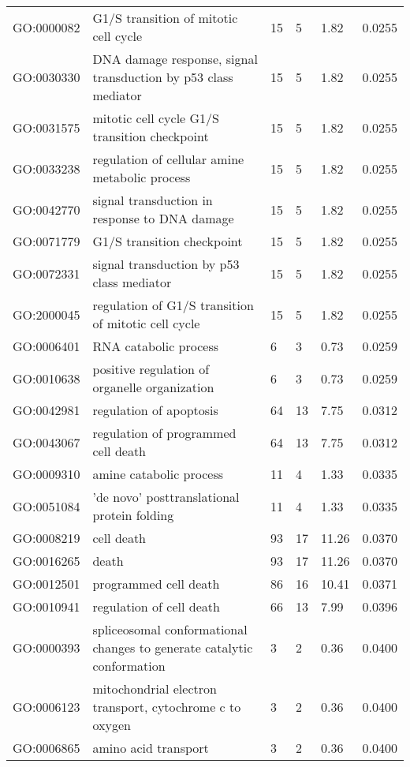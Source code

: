 \documentclass[10pt]{bmc_article}
\newenvironment{bmcformat}{\begin{raggedright}\baselineskip20pt\sloppy\setboolean{publ}{false}}{\end{raggedright}\baselineskip20pt\sloppy}
\begin{document}
\begin{bmcformat}
\begin{longtable}{lp{3cm}llll}
  GO:0000082 & G1/S transition of mitotic cell cycle &  15 &   5 & 1.82 & 0.0255 \\ 
  GO:0030330 & DNA damage response, signal transduction by p53 class mediator &  15 &   5 & 1.82 & 0.0255 \\ 
  GO:0031575 & mitotic cell cycle G1/S transition checkpoint &  15 &   5 & 1.82 & 0.0255 \\ 
  GO:0033238 & regulation of cellular amine metabolic process &  15 &   5 & 1.82 & 0.0255 \\ 
  GO:0042770 & signal transduction in response to DNA damage &  15 &   5 & 1.82 & 0.0255 \\ 
  GO:0071779 & G1/S transition checkpoint &  15 &   5 & 1.82 & 0.0255 \\ 
  GO:0072331 & signal transduction by p53 class mediator &  15 &   5 & 1.82 & 0.0255 \\ 
  GO:2000045 & regulation of G1/S transition of mitotic cell cycle &  15 &   5 & 1.82 & 0.0255 \\ 
  GO:0006401 & RNA catabolic process &   6 &   3 & 0.73 & 0.0259 \\ 
  GO:0010638 & positive regulation of organelle organization &   6 &   3 & 0.73 & 0.0259 \\ 
  GO:0042981 & regulation of apoptosis &  64 &  13 & 7.75 & 0.0312 \\ 
  GO:0043067 & regulation of programmed cell death &  64 &  13 & 7.75 & 0.0312 \\ 
  GO:0009310 & amine catabolic process &  11 &   4 & 1.33 & 0.0335 \\ 
  GO:0051084 & 'de novo' posttranslational protein folding &  11 &   4 & 1.33 & 0.0335 \\ 
  GO:0008219 & cell death &  93 &  17 & 11.26 & 0.0370 \\ 
  GO:0016265 & death &  93 &  17 & 11.26 & 0.0370 \\ 
  GO:0012501 & programmed cell death &  86 &  16 & 10.41 & 0.0371 \\ 
  GO:0010941 & regulation of cell death &  66 &  13 & 7.99 & 0.0396 \\ 
  GO:0000393 & spliceosomal conformational changes to generate catalytic conformation &   3 &   2 & 0.36 & 0.0400 \\ 
  GO:0006123 & mitochondrial electron transport, cytochrome c to oxygen &   3 &   2 & 0.36 & 0.0400 \\ 
  GO:0006865 & amino acid transport &   3 &   2 & 0.36 & 0.0400 \\ 

\end{longtable}
\end{bmcformat}
\end{document}
